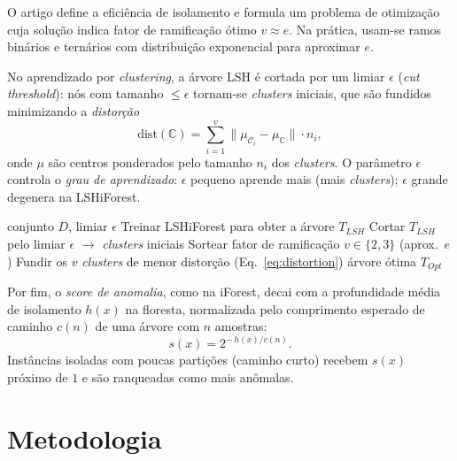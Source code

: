 \documentclass[conference]{IEEEtran}
\begin{document}
O artigo define a efici\^encia de
isolamento e formula um problema de otimiza\c{c}\~ao cuja solu\c{c}\~ao indica fator de
ramifica\c{c}\~ao \'otimo $v \approx e$. Na pr\'atica, usam-se ramos bin\'arios e
tern\'arios com distribui\c{c}\~ao exponencial para aproximar $e$.

No aprendizado por \emph{clustering}, a \'arvore LSH \'e cortada por um limiar
$\epsilon$ (\emph{cut threshold}): n\'os com tamanho $\le \epsilon$ tornam-se
\emph{clusters} iniciais, que s\~ao fundidos minimizando a \emph{distor\c{c}\~ao}
\begin{equation}
  \mathrm{dist}(\mathbb{C}) = \sum_{i=1}^{v} \lVert \mu_{\mathcal{C}_i} - \mu_{\mathbb{C}} \rVert \cdot n_i,
  \label{eq:distortion}
\end{equation}
onde $\mu$ s\~ao centros ponderados pelo tamanho $n_i$ dos \emph{clusters}. O
par\^ametro $\epsilon$ controla o \emph{grau de aprendizado}: $\epsilon$ pequeno
aprende mais (mais \emph{clusters}); $\epsilon$ grande degenera na LSHiForest.

\begin{algorithm}[h]
\caption{Constru\c{c}\~ao da \'arvore de isolamento \'otima (resumo).}
\label{alg:opt}
\begin{algorithmic}[1]
\Require conjunto $D$, limiar $\epsilon$
\State Treinar LSHiForest para obter a \'arvore $T_{LSH}$
\State Cortar $T_{LSH}$ pelo limiar $\epsilon$ $\rightarrow$ \emph{clusters} iniciais
  \State Sortear fator de ramifica\c{c}\~ao $v \in \{2,3\}$ (aprox.\ $e$)
  \State Fundir os $v$ \emph{clusters} de menor distor\c{c}\~ao (Eq.~\ref{eq:distortion})
\EndWhile
\State \Return \'arvore \'otima $T_{Opt}$
\end{algorithmic}
\end{algorithm}

Por fim, o \emph{score de anomalia}, como na iForest, decai com a profundidade
m\'edia de isolamento $h(x)$ na floresta, normalizada pelo comprimento esperado de
caminho $c(n)$ de uma \'arvore com $n$ amostras:
\begin{equation}
  s(x) = 2^{-\,h(x)/c(n)}.
  \label{eq:score}
\end{equation}
Inst\^ancias isoladas com poucas parti\c{c}\~oes (caminho curto) recebem $s(x)$
pr\'oximo de $1$ e s\~ao ranqueadas como mais an\^omalas.

\section{Metodologia}
\end{document}
